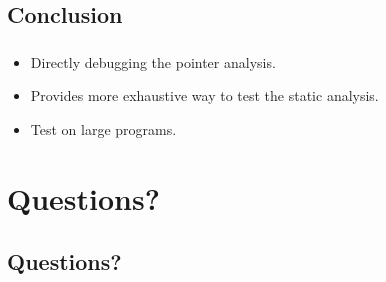 \documentclass[mathserif,10pt]{beamer}
\newcommand{\cmt}[1]{}
\begin{document}
\subsection{Conclusion}
\frame
{
  \frametitle{\subsecname}
  \begin{itemize}
    \item Directly debugging the pointer analysis.
      \cmt{
        Any failure is check is the direct evidence that the bug is in the static analysis, not anywhere else like in client code.
      }
    \item Provides more exhaustive way to test the static analysis.
      \cmt{
 the symbolic execution explores many possible execution paths of the test program
      }
    \item Test on large programs.
      \cmt{
         which are more likely to uncover new bugs
      }
  \end{itemize}
}

\section{Questions?}
\subsection{Questions?}
\frame
{}
\end{document}
